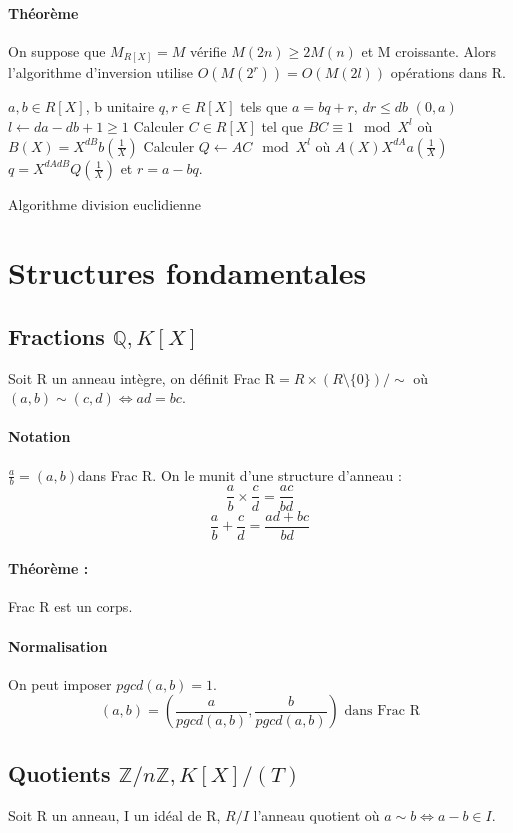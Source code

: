 \documentclass[12pt,a4paper]{report}
\begin{document}
\paragraph{Théorème\\}
On suppose que $M_{R[X]} = M $ vérifie $M(2n) \geqslant 2M(n)$ et M croissante. Alors l'algorithme d'inversion utilise $O(M(2^r))= O(M(2l))$ opérations dans R.
\begin{algorithm}[h!]
\begin{algorithmic}[1]
\REQUIRE $a,b \in R[X]$, b unitaire
\ENSURE $q,r \in R[X]$ tels que $ a=bq+r $,  $ dr \leqslant db $
\RETURN $(0,a)$ \ENDIF
\STATE $l \leftarrow da - db + 1 \geqslant 1$
\STATE Calculer $C \in R[X]$ tel que $BC \equiv 1 \mod X^l$ où $B(X) = X^{dB} b\left(\frac{1}{X}\right)$
\STATE Calculer $ Q \leftarrow AC \mod X^l$ où $A(X)  X^{dA} a\left(\frac{1}{X}\right)$
\RETURN $q=X^{dAdB}Q\left(\frac{1}{X}\right)$ et $r=a-bq$.
\end{algorithmic}
\caption{Algorithme division euclidienne}
\end{algorithm}
\section{Structures fondamentales}
\subsection{Fractions $ \mathbb{Q}, K[X]$}
Soit R un anneau intègre, on définit Frac R$ = R \times (R\setminus\{0\})/\sim$ où $(a,b) \sim (c,d) \Leftrightarrow ad=bc$.
\paragraph{Notation\\}
$\frac{a}{b} = (a,b) $dans Frac R. On le munit d'une structure d'anneau :
$$ \frac{a}{b} \times \frac{c}{d} =   \frac{ac}{bd} $$
$$  \frac{a}{b} +  \frac{c}{d} =  \frac{ad+bc}{bd}$$
\paragraph{Théorème :}
Frac R est un corps.
\paragraph{Normalisation\\}
On peut imposer $pgcd(a,b)=1$.
$$ (a,b) = \left( \frac{a}{pgcd(a,b)},  \frac{b}{pgcd(a,b)}\right) \mbox{ dans Frac R}$$
\subsection{Quotients $ \mathbb{Z}/n \mathbb{Z}, K[X]/(T)$}
Soit R un anneau, I un idéal de R, $ R/I$ l'anneau quotient où $a\sim b \Leftrightarrow a-b \in I$.
\end{document}

